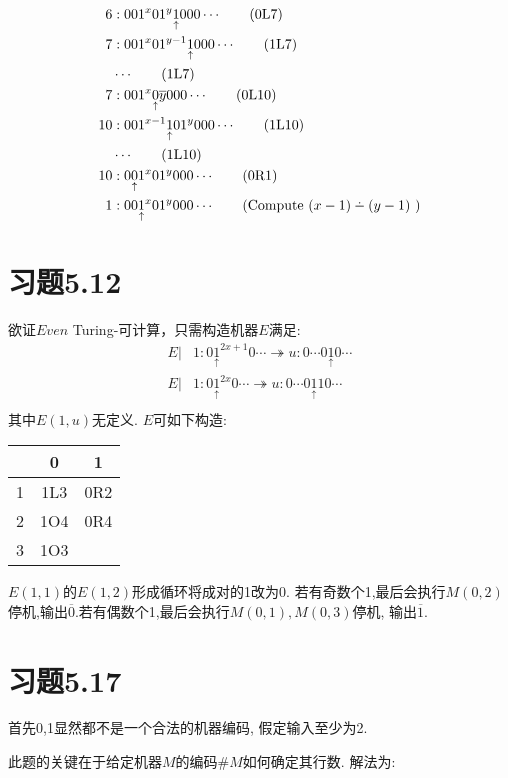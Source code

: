 \documentclass{article}
\newcommand*{\pt}[1]{\ensuremath{\underset{\uparrow}{#1}}}
\def\dotminus{\mathbin{\ooalign{\hss\raise1ex\hbox{.}\hss\cr
  \mathsurround=0pt$-$}}}
\begin{document}
\begin{itemize}
\begin{align*}
		6&:001^x01^{y}\pt1 000\cdots\tag{0L7}\\
		7&:001^x01^{y-1}\pt1 000\cdots\tag{1L7}\\
		&\cdots\tag{1L7}\\
		7&:001^x\pt0\overline { y} 000\cdots\tag{0L10}\\
		10&:001^{x-1}\pt101^{y} 000\cdots\tag{1L10}\\
		&\cdots\tag{1L10}\\
		10&:0\pt01^x01^{y} 000\cdots\tag{0R1}\\
		1&:00\pt1^x01^{y} 000\cdots\tag{Compute $(x-1)\dotminus(y-1)$ }\\
	\end{align*}
\end{itemize}
\section*{习题5.12}
欲证$Even$ Turing-可计算，只需构造机器$E$满足:
\begin{align*}
	E|&1:0\pt1^{2x+1}0\cdots \twoheadrightarrow u : 0\cdots0\pt10\cdots\\
	E|&1:0\pt1^{2x}0\cdots \twoheadrightarrow u : 0\cdots0\pt110\cdots\\
\end{align*}
其中$E(1,u)$无定义. 
$E$可如下构造:
\begin{center}
\begin{tabular}{|c|c|c|}
	\hline
	&0&1\\
	\hline
	1&1L3&0R2\\
	2&1O4&0R4\\
	3&1O3&\\
	\hline
\end{tabular}
\end{center}
$E(1,1)$的$E(1,2)$形成循环将成对的1改为0. 若有奇数个1,最后会执行$M(0,2)$停机,输出$\overline 0$.若有偶数个1,最后会执行$M(0,1),M(0,3)$停机, 输出$\overline 1$. 
\section*{习题5.17}
首先0,1显然都不是一个合法的机器编码, 假定输入至少为2. 

此题的关键在于给定机器$M$的编码$\#M$如何确定其行数.
解法为:
\end{document}
